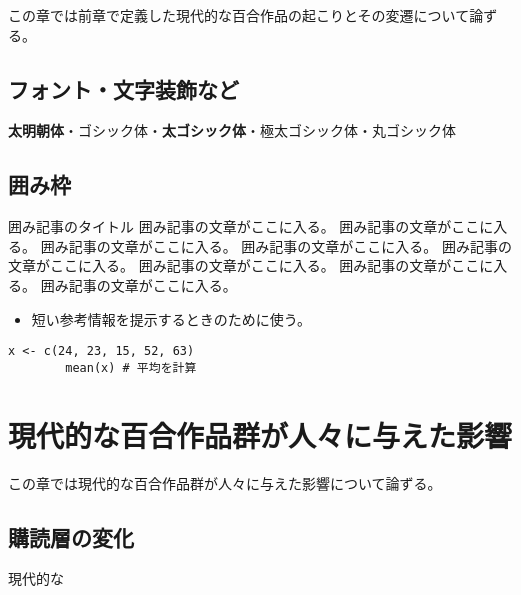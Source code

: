 \documentclass[ %
	uplatex,%
	a5paper,%
	papersize%
	]{jsbook}
\newcommand{\sanko}[1]{
		\begin{itemize}
			\item[\mysbox{\small\gtfamily 参考}] #1
		\end{itemize}
	}
\begin{document}
	\begin{summary}
		この章では前章で定義した現代的な百合作品の起こりとその変遷について論ずる。
	\end{summary}

	\section{フォント・文字装飾など}
	{\mcfamily\bfseries 太明朝体}・{\gtfamily ゴシック体}・{\gtfamily\bfseries 太ゴシック体}・{\gtfamily\ebseries 極太ゴシック体}・{\mgfamily 丸ゴシック体} 

	\section{囲み枠}

	\begin{note}{囲み記事のタイトル}
		囲み記事の文章がここに入る。
		囲み記事の文章がここに入る。
		囲み記事の文章がここに入る。
		囲み記事の文章がここに入る。
		囲み記事の文章がここに入る。
		囲み記事の文章がここに入る。
		囲み記事の文章がここに入る。
		囲み記事の文章がここに入る。
	\end{note}


	\sanko{短い参考情報を提示するときのために使う。}

	\begin{lstlisting}[caption=簡単なプログラムの例, label=ls:example]
		x <- c(24, 23, 15, 52, 63)
		mean(x) # 平均を計算
	\end{lstlisting}



	\chapter{現代的な百合作品群が人々に与えた影響}

	\begin{summary}
		この章では現代的な百合作品群が人々に与えた影響について論ずる。
	\end{summary}

	\section{購読層の変化}
	現代的な
\end{document}
